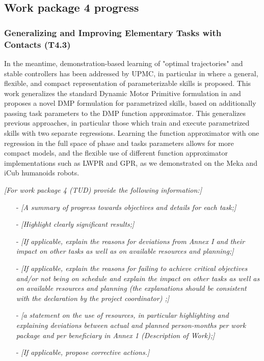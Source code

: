 \documentclass[12pt,a4paper,twoside]{article}
\begin{document}
\subsection{Work package 4 progress}

\subsubsection{Generalizing and Improving Elementary Tasks with Contacts (T4.3)}

In the meantime, demonstration-based learning of "optimal trajectories" and stable controllers has been addressed by UPMC, in particular in \cite{stulp2013} where a general, flexible, and compact representation of parameterizable skills is proposed. This work generalizes the standard Dynamic Motor Primitive formulation in \cite{ijspeert2013} and proposes a novel DMP formulation for parametrized skills, based on additionally passing task parameters to the DMP function approximator. This generalizes previous approaches, in particular those which train and execute parametrized skills with two separate regressions. Learning the function approximator with one regression in the full space of phase and tasks parameters allows for more compact models, and the flexible use of different function approximator implementations such as LWPR and GPR, as we demonstrated on the Meka and iCub humanoids robots.


\emph{\color{red}[For work package 4 (TUD) provide the following information:]}

\begin{itemize}
\item[-] \emph{\color{red}[A summary of progress towards objectives and details for each task;]}
\item[-] \emph{\color{red}[Highlight clearly significant results;]}
\item[-] \emph{\color{red}[If applicable, explain the reasons for deviations from Annex I and their impact on other tasks as well as on available resources and planning;]}
\item[-] \emph{\color{red}[If applicable, explain the reasons for failing to achieve critical objectives and/or not being on schedule and explain the impact on other tasks as well as on available resources and planning (the explanations should be consistent with the declaration by the project coordinator) ;]}
\item[-] \emph{\color{red}[a statement on the use of resources, in particular highlighting and explaining deviations between actual and planned  person-months per work package and per beneficiary in Annex 1 (Description of Work);]}
\item[-] \emph{\color{red}[If applicable, propose corrective actions.]}
\end{itemize}
\end{document}
